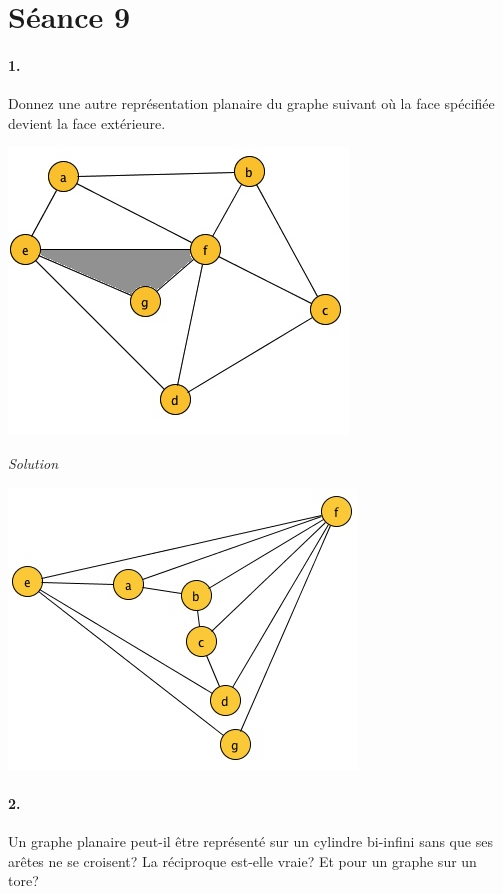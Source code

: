 \section{Séance 9}

\paragraph{1. } Donnez une autre représentation planaire du graphe suivant où la face spécifiée devient la face extérieure. 

\begin{center}
\includegraphics[scale=.4]{ape9_ex1_1.jpg} 
\end{center}

\textit{Solution}

\begin{center}
\includegraphics[scale=.4]{ape9_ex1_2.jpg} 
\end{center}

\paragraph{2. }Un graphe planaire peut-il être représenté sur un cylindre bi-infini sans que ses arêtes ne se croisent? La réciproque est-elle vraie? Et pour un graphe sur un tore? 

